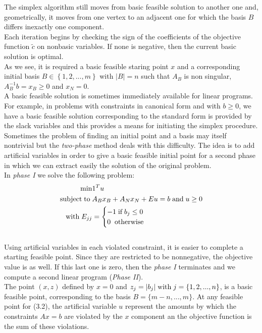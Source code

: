 \documentclass[a4paper,10 pt,titlepage,twoside]{book}
\theoremstyle{plain}
\theoremstyle{definition}
\theoremstyle{remark}
\begin{document}
The simplex algorithm still moves from basic feasible solution to another one and, geometrically, it moves from one vertex to an adjacent one for which the basis $B$ differs inexactly one component.\\ Each iteration begins by checking the sign of the coefficients of the objective function $\widetilde{c}$ on nonbasic variables. If none is negative, then the current basic solution is optimal. \\
As we see, it is required a basic feasible staring point $x$ and a corresponding initial basis $B \in \left\{ 1,2,..., m \right\}$ with $|B|=n$ such that $A_{B}$ is non singular, $A_{B}^{-1}b=x_{B} \geq 0$ and $x_{N}=0$.\\
A basic feasible solution is sometimes immediately available for linear programs. For example, in problems with constraints in canonical form and with $b \geq 0$, we have a basic feasible solution corresponding to the standard form is provided by the slack variables and this provides a means for initiating the
simplex procedure.\\Sometimes the problem of finding an initial point and a basis may itself nontrivial but the \textit{two-phase} method deals with this difficulty. The idea is to add artificial variables in order to give a basic feasible initial point for a second phase in which we can extract easily the solution of the original problem.\\
In \textit{phase I} we solve the following problem:
\begin{equation}
\begin{split}
\min &1^{T}u\\
\text{subject\;to\;}&A_{B}x_{B}+A_{N}x_{N} + Eu = b\;\text{and\;} u\geq 0\\
\text{with\;} E_{jj}& =\begin{cases} -1\;\text{if\;} b_{j} \leq 0\\
0\;\; \text{otherwise}
\end{cases}   
\end{split}
\end{equation} \\
Using artificial variables in each violated constraint, it is easier to complete a starting feasible point. Since they are restricted to be nonnegative, the objective value is as well. If this last one is zero, then the \textit{phase I} terminates and we compute a second linear program (\textit{Phase II}).\\
The point $(x,z)$ defined by $x =0$ and $z_{j} = |b_{j}| \text{\;with\;}j =\{1,2,...,n\}$, is a basic feasible point, corresponding to the basis $B = \{m-n,...,m\}$. At any feasible point for (3.2), the artificial variable $u$ represent the amounts by which the constraints $Ax = b$ are violated by the $x$ component an the objective function is the sum of these violations.
\end{document}
